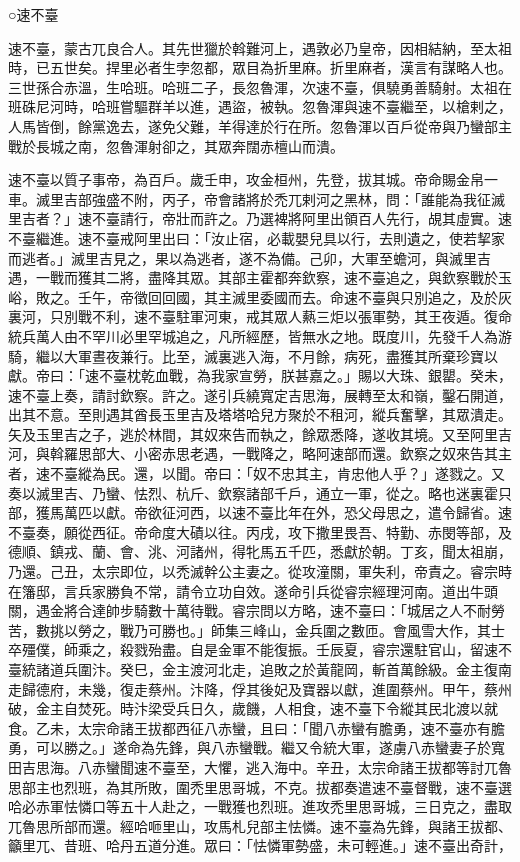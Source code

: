 
\begin{pinyinscope}

 ○速不臺



 速不臺，蒙古兀良合人。其先世獵於斡難河上，遇敦必乃皇帝，因相結納，至太祖時，已五世矣。捍里必者生孛忽都，眾目為折里麻。折里麻者，漢言有謀略人也。三世孫合赤溫，生哈班。哈班二子，長忽魯渾，次速不臺，俱驍勇善騎射。太祖在班硃尼河時，哈班嘗驅群羊以進，遇盜，被執。忽魯渾與速不臺繼至，以槍剌之，人馬皆倒，餘黨逸去，遂免父難，羊得達於行在所。忽魯渾以百戶從帝與乃蠻部主戰於長城之南，忽魯渾射卻之，其眾奔闊赤檀山而潰。



 速不臺以質子事帝，為百戶。歲壬申，攻金桓州，先登，拔其城。帝命賜金帛一車。滅里吉部強盛不附，丙子，帝會諸將於禿兀剌河之黑林，問：「誰能為我征滅里吉者？」速不臺請行，帝壯而許之。乃選裨將阿里出領百人先行，覘其虛實。速不臺繼進。速不臺戒阿里出曰：「汝止宿，必載嬰兒具以行，去則遺之，使若挈家而逃者。」滅里吉見之，果以為逃者，遂不為備。己卯，大軍至蟾河，與滅里吉遇，一戰而獲其二將，盡降其眾。其部主霍都奔欽察，速不臺追之，與欽察戰於玉峪，敗之。壬午，帝徵回回國，其主滅里委國而去。命速不臺與只別追之，及於灰裏河，只別戰不利，速不臺駐軍河東，戒其眾人爇三炬以張軍勢，其王夜遁。復命統兵萬人由不罕川必里罕城追之，凡所經歷，皆無水之地。既度川，先發千人為游騎，繼以大軍晝夜兼行。比至，滅裏逃入海，不月餘，病死，盡獲其所棄珍寶以獻。帝曰：「速不臺枕乾血戰，為我家宣勞，朕甚嘉之。」賜以大珠、銀罌。癸未，速不臺上奏，請討欽察。許之。遂引兵繞寬定吉思海，展轉至太和嶺，鑿石開道，出其不意。至則遇其酋長玉里吉及塔塔哈兒方聚於不租河，縱兵奮擊，其眾潰走。矢及玉里吉之子，逃於林間，其奴來告而執之，餘眾悉降，遂收其境。又至阿里吉河，與斡羅思部大、小密赤思老遇，一戰降之，略阿速部而還。欽察之奴來告其主者，速不臺縱為民。還，以聞。帝曰：「奴不忠其主，肯忠他人乎？」遂戮之。又奏以滅里吉、乃蠻、怯烈、杭斤、欽察諸部千戶，通立一軍，從之。略也迷裏霍只部，獲馬萬匹以獻。帝欲征河西，以速不臺比年在外，恐父母思之，遣令歸省。速不臺奏，願從西征。帝命度大磧以往。丙戌，攻下撒里畏吾、特勤、赤閔等部，及德順、鎮戎、蘭、會、洮、河諸州，得牝馬五千匹，悉獻於朝。丁亥，聞太祖崩，乃還。己丑，太宗即位，以禿滅幹公主妻之。從攻潼關，軍失利，帝責之。睿宗時在籓邸，言兵家勝負不常，請令立功自效。遂命引兵從睿宗經理河南。道出牛頭關，遇金將合達帥步騎數十萬待戰。睿宗問以方略，速不臺曰：「城居之人不耐勞苦，數挑以勞之，戰乃可勝也。」師集三峰山，金兵圍之數匝。會風雪大作，其士卒殭僕，師乘之，殺戮殆盡。自是金軍不能復振。壬辰夏，睿宗還駐官山，留速不臺統諸道兵圍汴。癸巳，金主渡河北走，追敗之於黃龍岡，斬首萬餘級。金主復南走歸德府，未幾，復走蔡州。汴降，俘其後妃及寶器以獻，進圍蔡州。甲午，蔡州破，金主自焚死。時汴梁受兵日久，歲饑，人相食，速不臺下令縱其民北渡以就食。乙未，太宗命諸王拔都西征八赤蠻，且曰：「聞八赤蠻有膽勇，速不臺亦有膽勇，可以勝之。」遂命為先鋒，與八赤蠻戰。繼又令統大軍，遂虜八赤蠻妻子於寬田吉思海。八赤蠻聞速不臺至，大懼，逃入海中。辛丑，太宗命諸王拔都等討兀魯思部主也烈班，為其所敗，圍禿里思哥城，不克。拔都奏遣速不臺督戰，速不臺選哈必赤軍怯憐口等五十人赴之，一戰獲也烈班。進攻禿里思哥城，三日克之，盡取兀魯思所部而還。經哈咂里山，攻馬札兒部主怯憐。速不臺為先鋒，與諸王拔都、籲里兀、昔班、哈丹五道分進。眾曰：「怯憐軍勢盛，未可輕進。」速不臺出奇計，
\end{pinyinscope}
